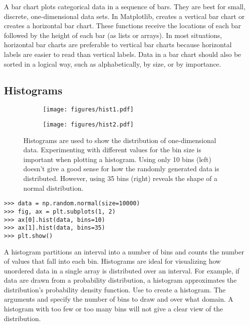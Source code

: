 A bar chart plots categorical data in a sequence of bars.
They are best for small, discrete, one-dimensional data sets.
In Matplotlib,  creates a vertical bar chart or  creates a horizontal bar chart.
These functions receive the locations of each bar followed by the height of each bar (as lists or arrays).
In most situations, horizontal bar charts are preferable to vertical bar charts because horizontal labels are easier to read than vertical labels.
Data in a bar chart should also be sorted in a logical way, such as alphabetically, by size, or by importance.

\subsection*{Histograms} %

\begin{figure}[H] %
    \centering
    \begin{subfigure}{.47\textwidth}
        \centering
        \texttt{[image: figures/hist1.pdf]}
    \end{subfigure}
    \begin{subfigure}{.47\textwidth}
        \centering
        \texttt{[image: figures/hist2.pdf]}
    \end{subfigure}
    \caption{Histograms are used to show the distribution of one-dimensional data. Experimenting with different values for the bin size is important when plotting a histogram. Using only 10 bins (left) doesn't give a good sense for how the randomly generated data is distributed. However, using 35 bins (right) reveals the shape of a normal distribution.}
\end{figure}

\begin{lstlisting}
>>> data = np.random.normal(size=10000)
>>> fig, ax = plt.subplots(1, 2)
>>> ax[0].hist(data, bins=10)
>>> ax[1].hist(data, bins=35)
>>> plt.show()
\end{lstlisting}

A histogram partitions an interval into a number of bins and counts the number of values that fall into each bin.
Histograms are ideal for visualizing how unordered data in a single array is distributed over an interval.
For example, if data are drawn from a probability distribution, a histogram approximates the distribution's probability density function.
Use  to create a histogram.
The arguments  and  specify the number of bins to draw and over what domain.
A histogram with too few or too many bins will not give a clear view of the distribution.

